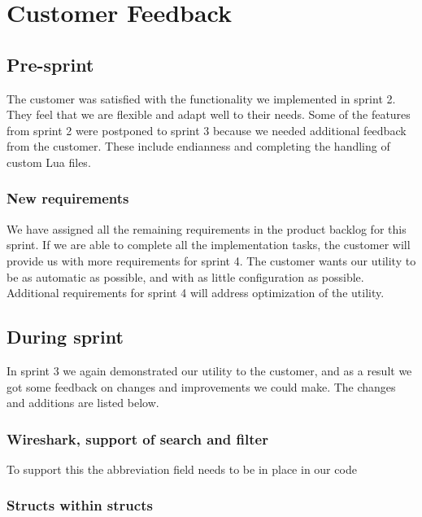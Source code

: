 \section{Customer Feedback}

\subsection{Pre-sprint}

The customer was satisfied with the functionality we implemented in sprint 2.
They feel that we are flexible and adapt well to their needs.
Some of the features from sprint 2 were postponed to sprint 3 because we needed additional feedback from the customer.
These include endianness and completing the handling of custom Lua files.

\subsubsection{New requirements}

We have assigned all the remaining requirements in the product backlog for this sprint.
If we are able to complete all the implementation tasks, the customer will provide us with more requirements for sprint 4.
The customer wants our utility to be as automatic as possible, and with as little configuration as possible. 
Additional requirements for sprint 4 will address optimization of the utility.

\subsection{During sprint}

In sprint 3 we again demonstrated our utility to the customer, and as a result we got some feedback on changes
and improvements we could make. The changes and additions are listed below.

\subsubsection{Wireshark, support of search and filter}

To support this the abbreviation field needs to be in place in our code

\subsubsection{Structs within structs}

